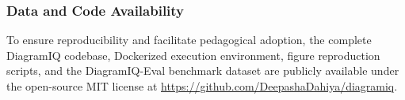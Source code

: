 \documentclass[runningheads]{llncs}
\begin{document}
\subsubsection*{Data and Code Availability}
To ensure reproducibility and facilitate pedagogical adoption, the complete DiagramIQ codebase, Dockerized execution environment, figure reproduction scripts, and the DiagramIQ-Eval benchmark dataset are publicly available under the open-source MIT license at \url{https://github.com/DeepashaDahiya/diagramiq}.

\FloatBarrier



\end{document}
